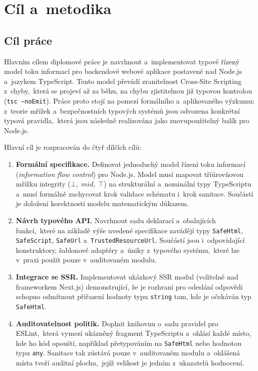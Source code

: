 \chapter{Cíl a~metodika}
\label{chap:cil}

\section{Cíl práce}

Hlavním cílem diplomové práce je navrhnout a~implementovat typově řízený model toku informací pro backendové webové aplikace postavené nad Node.js a~jazykem TypeScript. Tento model převádí zranitelnost Cross-Site Scripting z~chyby,~která se projeví až za běhu, na chybu zjistitelnou již typovou kontrolou (\texttt{tsc --noEmit}). Práce proto stojí na pomezí formálního a~aplikovaného výzkumu: z~teorie mřížek a~bezpečnostních typových systémů jsou odvozena konkrétní typová pravidla,~která jsou následně realizována jako znovupoužitelný balík pro Node.js.

\noindent Hlavní cíl je rozpracován do čtyř dílčích cílů:
\begin{enumerate}
    \item \textbf{Formální specifikace.} Definovat jednoduchý model řízení toku informací (\emph{information flow control}) pro Node.js. Model musí mapovat tříúrovňovou mřížku integrity ($\bot,\;\mathit{mid},\;\top$) na strukturální a~nominální typy TypeScriptu a~musí formálně zachycovat krok validace schématu i~krok sanitace. Součástí je doložení korektnosti modelu matematickým důkazem.
    \item \textbf{Návrh typového API.} Navrhnout sadu deklarací a~obalujících funkcí,~které na základě výše uvedené specifikace zavádějí typy \texttt{SafeHtml}, \texttt{SafeScript}, \texttt{SafeUrl} a~\texttt{TrustedResourceUrl}. Součástí jsou i~odpovídající konstruktory, šablonové adaptéry a~úniky z~typového systému,~které lze v~praxi použít pouze v~auditovaném modulu.
    \item \textbf{Integrace se SSR.} Implementovat ukázkový SSR modul (volitelně nad frameworkem Next.js) demonstrující, že je rozhraní pro odeslání odpovědi schopno odmítnout přiřazení hodnoty typu \texttt{string} tam, kde je očekáván typ \texttt{SafeHtml}.
    \item \textbf{Auditovatelnost politik.} Doplnit knihovnu o~sadu pravidel pro ESLint,~která vymezí ukázněný fragment TypeScriptu a~ohlásí každé místo, kde ho kód opouští, například přetypováním na \texttt{SafeHtml} nebo hodnotou typu \texttt{any}. Sanitace tak zůstává pouze v~auditovaném modulu a~ohlášená místa tvoří auditní plochu,~jejíž velikost je jedním z~ukazatelů hodnocení.
\end{enumerate}

